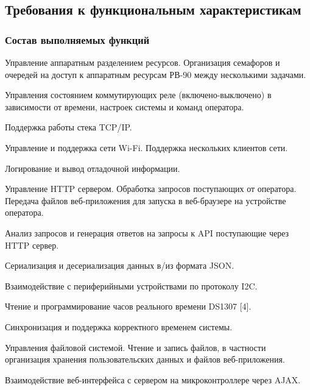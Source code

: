 \subsection{Требования к функциональным характеристикам}
\subsubsection{Состав выполняемых функций}

\begin{my_enumerate}
\item Управление аппаратным разделением ресурсов. Организация семафоров и очередей на доступ к аппаратным ресурсам РВ-90 между несколькими задачами.
\item Управления состоянием коммутирующих реле (включено-выключено) в зависимости от времени, настроек системы и команд оператора.
\item Поддержка работы стека TCP/IP.
\item Управление и поддержка сети Wi-Fi. Поддержка нескольких клиентов сети.
\item Логирование и вывод отладочной информации.
\item Управление HTTP сервером. Обработка запросов поступающих от оператора. Передача файлов веб-приложения для запуска в веб-браузере на устройстве оператора. 
\item Анализ запросов и генерация ответов на запросы к API поступающие через HTTP сервер.
\item Сериализация и десериализация данных в/из формата JSON.
\item Взаимодействие с периферийными устройствами по протоколу I2C.
\item Чтение и программирование часов реального времени DS1307 [4].
\item Синхронизация и поддержка корректного временем системы.
\item Управления файловой системой. Чтение и запись файлов, в частности организация хранения пользовательских данных и файлов веб-приложения.
\item Взаимодействие веб-интерфейса с сервером на микроконтроллере через AJAX.
\end{my_enumerate}

